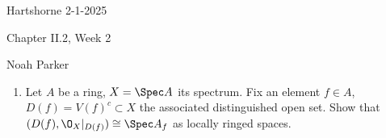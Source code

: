 \documentclass[12pt]{amsart}
\begin{document}
{Hartshorne} \hfill {2-1-2025}

\bigskip\bigskip

\begin{center}

{\sc Chapter II.2, Week 2}

\end{center}

\begin{center}

  {Noah Parker} %
    
\end{center}

\bigskip

\begin{enumerate}
	\item[2.1.] {
      Let $A$ be a ring, $X=\Spec A$ its spectrum.
      Fix an element $f\in A$, $D(f)=V(f)^c\subset X$ the associated distinguished open set.
      Show that $(D(f),\O_X|_{D(f)})\cong \Spec A_f$ as locally ringed spaces.
    }
\end{enumerate}
\end{document}
